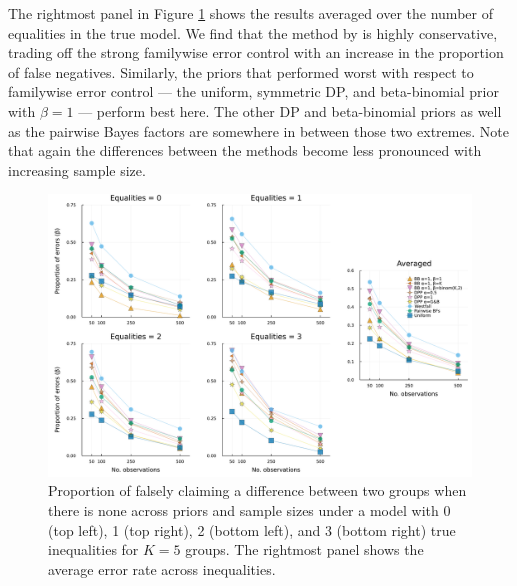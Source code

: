 \documentclass[11pt,a4paper]{article}
\theoremstyle{definition} %
\theoremstyle{case}
\begin{document}
The rightmost panel in Figure \ref{fig:big_simulation-II} shows the results averaged over the number of equalities in the true model. We find that the method by \textcite{westfall1997bayesian} is highly conservative, trading off the strong familywise error control with an increase in the proportion of false negatives. Similarly, the priors that performed worst with respect to familywise error control — the uniform, symmetric DP, and beta-binomial prior with $\beta = 1$ — perform best here. The other DP and beta-binomial priors as well as the pairwise Bayes factors are somewhere in between those two extremes. Note that again the differences between the methods become less pronounced with increasing sample size.


\begin{figure}[!h]
    \centering
    \includegraphics[width=1\textwidth]{subset_k_5_beta.pdf}
    \caption{Proportion of falsely claiming a difference between two groups when there is none across priors and sample sizes under a model with 0 (top left), 1 (top right), 2 (bottom left), and 3 (bottom right) true inequalities for $K = 5$ groups. The rightmost panel shows the average error rate across inequalities.}
    \label{fig:big_simulation-II}
\end{figure}
\end{document}
